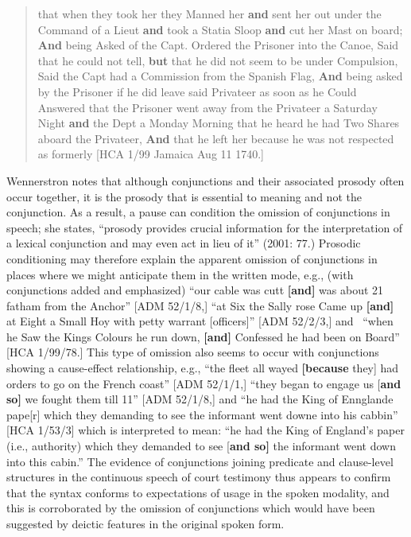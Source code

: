 \documentclass[12pt]{article}
\newenvironment{styleStandard}{\renewcommand\baselinestretch{1.0}\setlength\leftskip{0cm}\setlength\rightskip{0cm plus 1fil}\setlength\parindent{0cm}\setlength\parfillskip{0pt plus 1fil}\setlength\parskip{0in plus 1pt}\writerlistparindent\writerlistleftskip\leavevmode\normalfont\normalsize\writerlistlabel\ignorespaces}{\unskip\vspace{0in plus 1pt}\par}
\newcommand\writerlistleftskip{}
\newcommand\writerlistparindent{}
\newcommand\writerlistlabel{}
\begin{document}
\begin{quotation}
that when they took her they Manned her \textbf{and} sent her out under the Command of a Lieut \textbf{and} took a Statia Sloop \textbf{and} cut her Mast on board; \textbf{And} being Asked of the Capt. Ordered the Prisoner into the Canoe, Said that he could not tell, \textbf{but} that he did not seem to be under Compulsion, Said the Capt had a Commission from the Spanish Flag, \textbf{And} being asked by the Prisoner if he did leave said Privateer as soon as he Could Answered that the Prisoner went away from the Privateer a Saturday Night\textbf{ and} the Dept a Monday Morning that he heard he had Two Shares aboard the Privateer, \textbf{And} that he left her because he was not respected as formerly [HCA 1/99 Jamaica Aug 11 1740.]

\end{quotation}
\begin{styleStandard}
Wennerstron notes that although conjunctions and their associated prosody often occur together, it is the prosody that is essential to meaning and not the conjunction. As a result, a pause can condition the omission of conjunctions in speech; she states, “prosody provides crucial information for the interpretation of a lexical conjunction and may even act in lieu of it” (2001: 77.) Prosodic conditioning may therefore explain the apparent omission of conjunctions in places where we might anticipate them in the written mode, e.g., (with conjunctions added and emphasized) “our cable was cutt \textbf{[and]} was about 21 fatham from the Anchor” [ADM 52/1/8,] “at Six the Sally rose Came up \textbf{[and]} at Eight a Small Hoy with petty warrant [officers]” [ADM 52/2/3,] and \ “when he Saw the Kings Colours he run down, \textbf{[and]} Confessed he had been on Board” [HCA 1/99/78.] This type of omission also seems to occur with conjunctions showing a cause-effect relationship, e.g., “the fleet all wayed \textbf{[because }they] had orders to go on the French coast” [ADM 52/1/1,] “they began to engage us [\textbf{and so]} we fought them till 11” [ADM 52/1/8,] and “he had the King of Ennglande pape[r] which they demanding to see the informant went downe into his cabbin” [HCA 1/53/3] which is interpreted to mean: “he had the King of England’s paper (i.e., authority) which they demanded to see [\textbf{and so]} the informant went down into this cabin.” The evidence of conjunctions joining predicate and clause-level structures in the continuous speech of court testimony thus appears to confirm that the syntax conforms to expectations of usage in the spoken modality, and this is corroborated by the omission of conjunctions which would have been suggested by deictic features in the original spoken form. 
\end{styleStandard}
\end{document}

